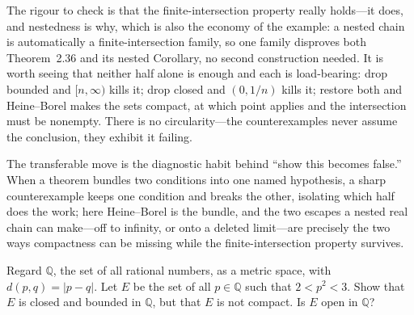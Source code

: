 \documentclass[main.tex]{subfiles}
\begin{document}
\begin{Reflection}
The rigour to check is that the finite-intersection property really holds---it does, and nestedness is
why, which is also the economy of the example: a nested chain is automatically a finite-intersection
family, so one family disproves both Theorem~2.36 and its nested Corollary, no second construction
needed. It is worth seeing that neither half alone is enough and each is load-bearing: drop bounded and
$[n,\infty)$ kills it; drop closed and $(0,1/n)$ kills it; restore both and Heine--Borel makes the sets
compact, at which point  applies and the intersection must be nonempty. There is no
circularity---the counterexamples never assume the conclusion, they exhibit it failing.

The transferable move is the diagnostic habit behind ``show this becomes false.'' When a theorem
bundles two conditions into one named hypothesis, a sharp counterexample keeps one condition and breaks
the other, isolating which half does the work; here Heine--Borel is the bundle, and the two escapes a
nested real chain can make---off to infinity, or onto a deleted limit---are precisely the two ways
compactness can be missing while the finite-intersection property survives.
\end{Reflection}

Regard $\mathbb Q$, the set of all rational numbers, as a metric space, with $d(p,q)=|p-q|$. Let $E$
be the set of all $p\in\mathbb Q$ such that $2<p^2<3$. Show that $E$ is closed and bounded in
$\mathbb Q$, but that $E$ is not compact. Is $E$ open in $\mathbb Q$?
\end{document}
